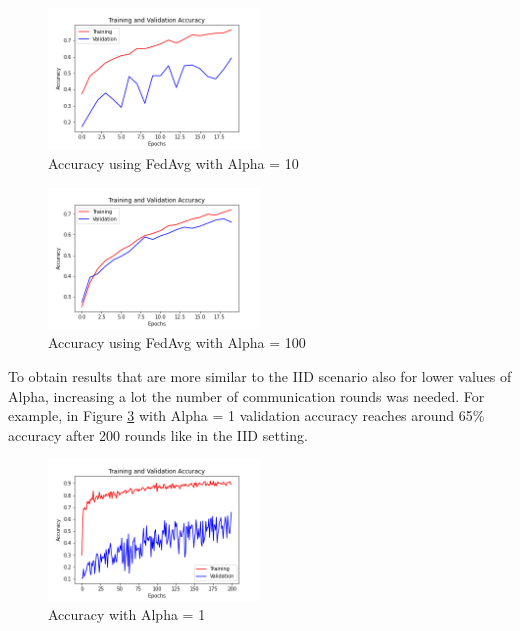 \documentclass[twocolumn]{article}
\begin{document}
\begin{figure}
    \centering
    \includegraphics[width=0.5\textwidth,height=.3\textheight]{2_AccuracyFedAvg_A10.png}
    \caption{Accuracy using FedAvg with Alpha = 10}
     \label{AccFedAvgA10} 
\end{figure}

\begin{figure}
    \centering
    \includegraphics[width=0.5\textwidth,height=.3\textheight]{2_AccuracyFedAvg_A100.png}
    \caption{Accuracy using FedAvg with Alpha = 100}
     \label{AccFedAvgA100} 
\end{figure}

To obtain results that are more similar to the IID scenario also for lower values of Alpha, increasing a lot the number of communication rounds was needed. For example, in Figure \ref{AccA1R200} with Alpha = 1 validation accuracy reaches around 65\% accuracy after 200 rounds like in the IID setting.
\begin{figure}
    \centering
    \includegraphics[width=0.5\textwidth,height=.3\textheight]{3_AccuracyFedAvg_A1R200.png}
    \caption{Accuracy with Alpha = 1}
    \label{AccA1R200} 
\end{figure}
\end{document}
